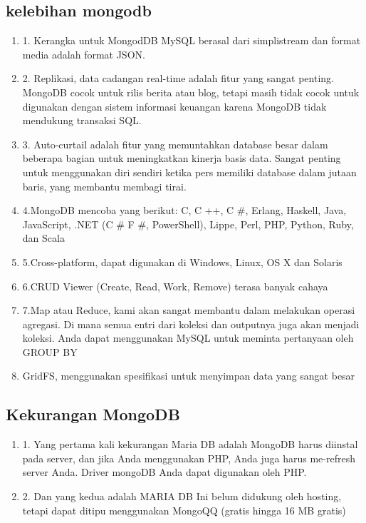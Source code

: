 \subsection{kelebihan mongodb}
\begin{enumerate}
\item
1. Kerangka untuk MongodDB MySQL berasal dari simplistream dan format media adalah format JSON.
\item
2. Replikasi, data cadangan real-time adalah fitur yang sangat penting. MongoDB cocok untuk rilis berita atau blog, tetapi masih tidak cocok untuk digunakan dengan sistem informasi keuangan karena MongoDB tidak mendukung transaksi SQL.
\item
3. Auto-curtail adalah fitur yang memuntahkan database besar dalam beberapa bagian untuk meningkatkan kinerja basis data. Sangat penting untuk menggunakan diri sendiri ketika pers memiliki database dalam jutaan baris, yang membantu membagi tirai.
\item
4.MongoDB mencoba yang berikut: C, C ++, C \#, Erlang, Haskell, Java, JavaScript, .NET (C \# F \#, PowerShell), Lippe, Perl, PHP, Python, Ruby, dan Scala
\item
5.Cross-platform, dapat digunakan di Windows, Linux, OS X dan Solaris
\item
6.CRUD Viewer (Create, Read, Work, Remove) terasa banyak cahaya
\item
7.Map atau Reduce, kami akan sangat membantu dalam melakukan operasi agregasi. Di mana semua entri dari koleksi dan outputnya juga akan menjadi koleksi. Anda dapat menggunakan MySQL untuk meminta pertanyaan oleh GROUP BY
\item
GridFS, menggunakan spesifikasi untuk menyimpan data yang sangat besar
\end{enumerate}

\subsection{Kekurangan MongoDB}
\begin{enumerate}
\item
1.	Yang pertama kali kekurangan Maria DB adalah MongoDB harus diinstal pada server, dan jika Anda menggunakan PHP, Anda juga harus me-refresh server Anda. Driver mongoDB Anda dapat digunakan oleh PHP.
\item
2.	Dan yang kedua adalah MARIA DB Ini belum didukung oleh hosting, tetapi dapat ditipu menggunakan MongoQQ (gratis hingga 16 MB gratis)
\end{enumerate}

